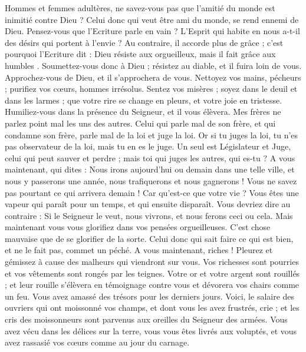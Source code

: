 \begin{multicols}{2}
Hommes et femmes adultères, ne savez-vous pas que l'amitié du monde est inimitié contre Dieu ? Celui donc qui veut être ami du monde, se rend ennemi de Dieu.
Pensez-vous que l'Ecriture parle en vain ? L'Esprit qui habite en nous a-t-il des désirs qui portent à l'envie ?
Au contraire, il accorde plus de grâce ; c'est pourquoi l'Ecriture dit : Dieu résiste aux orgueilleux, mais il fait grâce aux humbles{} .
Soumettez-vous donc à Dieu ; résistez au diable, et il fuira loin de vous.
Approchez-vous de Dieu, et il s'approchera de vous. Nettoyez vos mains, pécheurs ; purifiez vos cœurs, hommes irrésolus.
Sentez vos misères ; soyez dans le deuil et dans les larmes ; que votre rire se change en pleurs, et votre joie en tristesse.
Humiliez-vous dans la présence du Seigneur, et il vous élèvera.
Mes frères ne parlez point mal les uns des autres. Celui qui parle mal de son frère, et qui condamne son frère, parle mal de la loi et juge la loi. Or si tu juges la loi, tu n'es pas observateur de la loi, mais tu en es le juge.
Un seul est Législateur et Juge, celui qui peut sauver et perdre ; mais toi qui juges les autres, qui es-tu ?
A vous maintenant, qui dites : Nous irons aujourd'hui ou demain dans une telle ville, et nous y passerons une année, nous trafiquerons et nous gagnerons !
Vous ne savez pas pourtant ce qui arrivera demain ! Car qu’est-ce que votre vie ? Vous êtes une vapeur qui paraît pour un temps, et qui ensuite disparaît.
Vous devriez dire au contraire : Si le Seigneur le veut, nous vivrons, et nous ferons ceci ou cela.
Mais maintenant vous vous glorifiez dans vos pensées orgueilleuses. C’est chose mauvaise que de se glorifier de la sorte.
Celui donc qui sait faire ce qui est bien, et ne le fait pas, commet un péché.
\VerseOne{}A vous maintenant, riches ! Pleurez et gémissez à cause des malheurs qui viendront sur vous.
Vos richesses sont pourries et vos vêtements sont rongés par les teignes.
Votre or et votre argent sont rouillés ; et leur rouille s’élèvera en témoignage contre vous et dévorera vos chairs comme un feu. Vous avez amassé des trésors pour les derniers jours.
Voici, le salaire des ouvriers qui ont moissonné vos champs, et dont vous les avez frustrés, crie ; et les cris des moissonneurs sont parvenus aux oreilles du Seigneur des armées.
Vous avez vécu dans les délices sur la terre, vous vous êtes livrés aux voluptés, et vous avez rassasié vos cœurs comme au jour du carnage.

\end{multicols}
